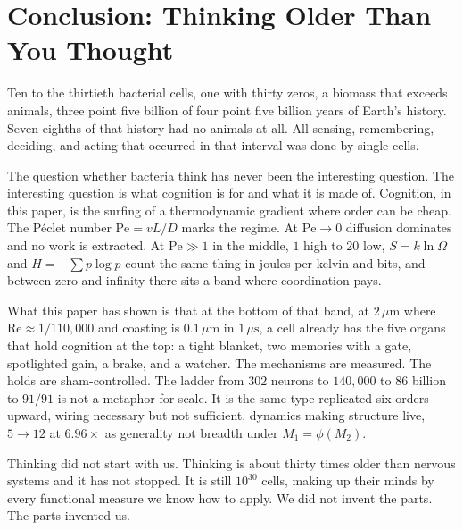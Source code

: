 \documentclass[12pt,a4paper]{article}
\newcommand{\Pe}{\mathrm{Pe}}
\newcommand{\Rey}{\mathrm{Re}}
\begin{document}
\section{Conclusion: Thinking Older Than You Thought}
\label{sec:conclusion}

Ten to the thirtieth bacterial cells, one with thirty zeros, a biomass that exceeds animals, three point five billion of four point five billion years of Earth's history. Seven eighths of that history had no animals at all. All sensing, remembering, deciding, and acting that occurred in that interval was done by single cells.

The question whether bacteria think has never been the interesting question. The interesting question is what cognition is for and what it is made of. Cognition, in this paper, is the surfing of a thermodynamic gradient where order can be cheap. The P\'eclet number $\Pe = vL/D$ marks the regime. At $\Pe \to 0$ diffusion dominates and no work is extracted. At $\Pe \gg 1$ in the middle, $1$ high to $20$ low, $S = k\ln\Omega$ and $H = -\sum p\log p$ count the same thing in joules per kelvin and bits, and between zero and infinity there sits a band where coordination pays.

What this paper has shown is that at the bottom of that band, at $2\,\mu\mathrm{m}$ where $\Rey \approx 1/110{,}000$ and coasting is $0.1\,\mu\mathrm{m}$ in $1\,\mu\mathrm{s}$, a cell already has the five organs that hold cognition at the top: a tight blanket, two memories with a gate, spotlighted gain, a brake, and a watcher. The mechanisms are measured. The holds are sham-controlled. The ladder from $302$ neurons to $140{,}000$ to $86$ billion to $91/91$ is not a metaphor for scale. It is the same type replicated six orders upward, wiring necessary but not sufficient, dynamics making structure live, $5\to12$ at $6.96\times$ as generality not breadth under $M_1 = \phi(M_2)$.

Thinking did not start with us. Thinking is about thirty times older than nervous systems and it has not stopped. It is still $10^{30}$ cells, making up their minds by every functional measure we know how to apply. We did not invent the parts. The parts invented us.
\end{document}
